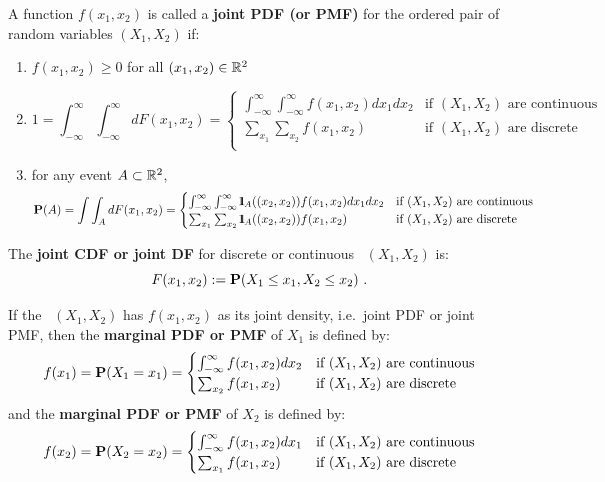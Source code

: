 \begin{definition}
A function $f(x_1,x_2)$ is called a {\bf joint PDF (or PMF)} for the ordered pair of random variables $(X_1,X_2)$ if:
\begin{enumerate}
\item $f(x_1,x_2) \geq 0$ for all $(x_1,x_2) \in \mathbb{R}^2$
\item
$$
1= \int_{-\infty}^{\infty} \int_{-\infty}^{\infty} dF(x_1,x_2) =
\begin{cases}
\int_{-\infty}^{\infty} \int_{-\infty}^{\infty} f(x_1,x_2) dx_1 dx_2 & \text{if $(X_1,X_2)$ are continuous}  \\
\sum_{x_1} \sum_{x_2} f(x_1,x_2) & \text{if $(X_1,X_2)$ are discrete} \\
\end{cases}
$$
\item for any event $A \subset \mathbb{R}^2$,
$$
\mathbf{P}(A) =  \int \int_{A} dF(x_1,x_2) =
\begin{cases}
\int_{-\infty}^{\infty} \int_{-\infty}^{\infty} {1}\mspace{-11 mu}{1}_A((x_2,x_2)) f(x_1,x_2) dx_1 dx_2 & \text{if $(X_1,X_2)$ are continuous}  \\
\sum_{x_1} \sum_{x_2}  {1}\mspace{-11 mu}{1}_A((x_2,x_2)) f(x_1,x_2) & \text{if $(X_1,X_2)$ are discrete} \\
\end{cases}
$$
\end{enumerate}
The {\bf joint CDF or joint DF} for discrete or continuous \rv~$(X_1,X_2)$ is:
\[
F(x_1,x_2) := \mathbf{P}(X_1 \leq x_1, X_2 \leq x_2) \ .
\]
\end{definition}

\begin{definition}
If the \rv~$(X_1,X_2)$ has $f(x_1,x_2)$ as its joint density, i.e.~joint PDF or joint PMF, then the {\bf marginal PDF or PMF} of $X_1$ is defined by:
\[
f(x_1) = \mathbf{P}(X_1=x_1) =
\begin{cases}
\int_{-\infty}^{\infty} f(x_1,x_2) dx_2 & \text{if $(X_1,X_2)$ are continuous}  \\
\sum_{x_2} f(x_1,x_2) & \text{if $(X_1,X_2)$ are discrete} \\
\end{cases}
\]
and the  {\bf marginal PDF or PMF} of $X_2$ is defined by:
\[
f(x_2) = \mathbf{P}(X_2=x_2) =
\begin{cases}
\int_{-\infty}^{\infty} f(x_1,x_2) dx_1 & \text{if $(X_1,X_2)$ are continuous}  \\
\sum_{x_1} f(x_1,x_2) & \text{if $(X_1,X_2)$ are discrete} \\
\end{cases}
\]
\end{definition}

